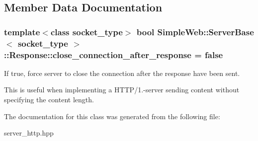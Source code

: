 \subsection{Member Data Documentation}
\subsubsection[{\texorpdfstring{close\+\_\+connection\+\_\+after\+\_\+response}{close\_connection\_after\_response}}]{\setlength{\rightskip}{0pt plus 5cm}template$<$class socket\+\_\+type$>$ bool {\bf Simple\+Web\+::\+Server\+Base}$<$ socket\+\_\+type $>$\+::Response\+::close\+\_\+connection\+\_\+after\+\_\+response = false}\hypertarget{a00251_a2818b4f3c577ff1f4067bb1c62640c15}{}\label{a00251_a2818b4f3c577ff1f4067bb1c62640c15}
If true, force server to close the connection after the response have been sent.

This is useful when implementing a H\+T\+T\+P/1.-\/server sending content without specifying the content length. 

The documentation for this class was generated from the following file\+:\begin{DoxyCompactItemize}
\item 
server\+\_\+http.\+hpp\end{DoxyCompactItemize}
